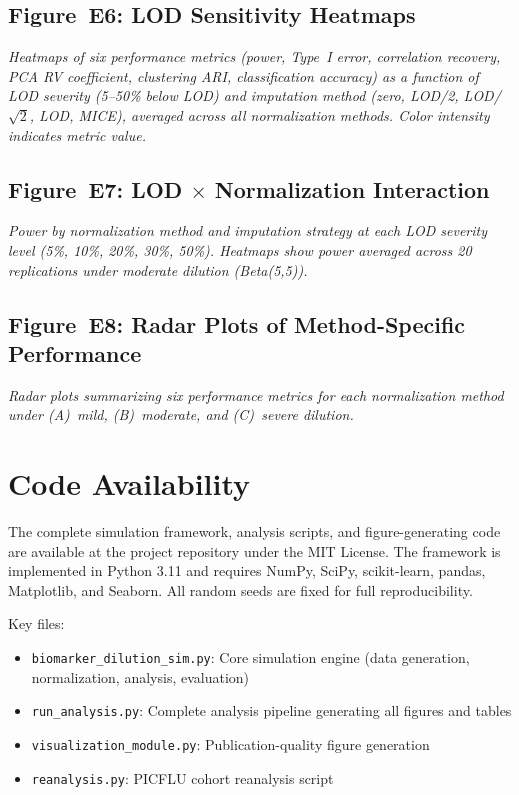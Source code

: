 \documentclass[12pt]{article}
\begin{document}
\subsection*{Figure~E6: LOD Sensitivity Heatmaps}
\textit{Heatmaps of six performance metrics (power, Type~I error, correlation recovery, PCA RV coefficient, clustering ARI, classification accuracy) as a function of LOD severity (5--50\% below LOD) and imputation method (zero, LOD/2, LOD/$\sqrt{2}$, LOD, MICE), averaged across all normalization methods. Color intensity indicates metric value.}

\subsection*{Figure~E7: LOD $\times$ Normalization Interaction}
\textit{Power by normalization method and imputation strategy at each LOD severity level (5\%, 10\%, 20\%, 30\%, 50\%). Heatmaps show power averaged across 20 replications under moderate dilution (Beta(5,5)).}

\subsection*{Figure~E8: Radar Plots of Method-Specific Performance}
\textit{Radar plots summarizing six performance metrics for each normalization method under (A)~mild, (B)~moderate, and (C)~severe dilution.}

\section{Code Availability}

The complete simulation framework, analysis scripts, and figure-generating code are available at the project repository under the MIT License. The framework is implemented in Python 3.11 and requires NumPy, SciPy, scikit-learn, pandas, Matplotlib, and Seaborn. All random seeds are fixed for full reproducibility.

Key files:
\begin{itemize}
\item \texttt{biomarker\_dilution\_sim.py}: Core simulation engine (data generation, normalization, analysis, evaluation)
\item \texttt{run\_analysis.py}: Complete analysis pipeline generating all figures and tables
\item \texttt{visualization\_module.py}: Publication-quality figure generation
\item \texttt{reanalysis.py}: PICFLU cohort reanalysis script
\end{itemize}



\end{document}
